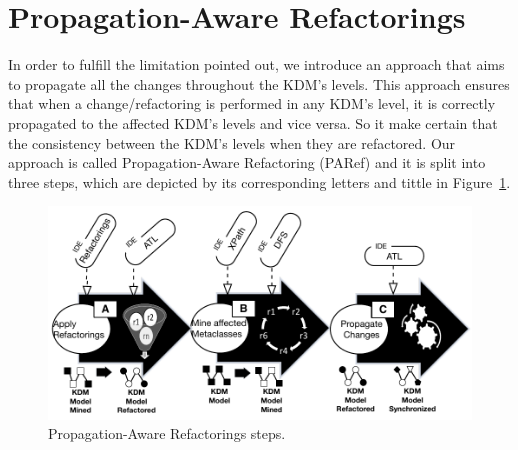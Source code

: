 %
\section{Propagation-Aware Refactorings} %
\label{sec:the_approach}

In order to fulfill the limitation pointed out, we introduce an approach that aims to propagate all the changes throughout the KDM's levels. This approach ensures that when a change/refactoring is performed in any KDM's level, it is correctly propagated to the affected KDM's levels and vice versa. So it make certain that the consistency between the KDM's levels when they are refactored. 
Our approach is called Propagation-Aware Refactoring (PARef) and it is split into three steps, which are depicted by its corresponding letters and tittle in Figure~\ref{fig:approach}. 



\begin{figure}[h]
	\centering
	\includegraphics[scale=0.54]{figuras/approachSteps}
	\caption{Propagation-Aware Refactorings steps.}
	\label{fig:approach}
\end{figure}


